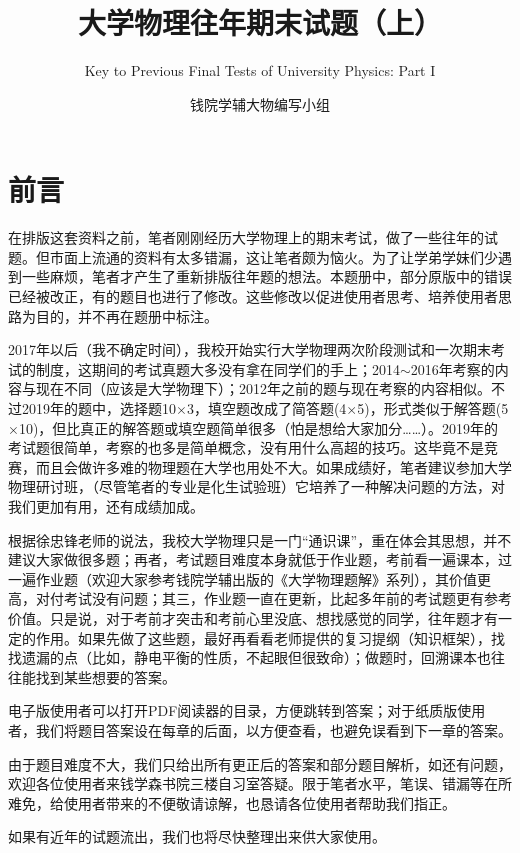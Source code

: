 \documentclass[b5paper,opensource]{./template/qyxf-book}
\title{大学物理往年期末试题（上）}
\subtitle{Key to Previous Final Tests of University Physics: Part I}
\author{钱院学辅大物编写小组}
\begin{document}
\maketitle
\pagestyle{plain}
\chapter*{前言}%
在排版这套资料之前，笔者刚刚经历大学物理上的期末考试，做了一些往年的试题。但市面上流通的资料有太多错漏，这让笔者颇为恼火。为了让学弟学妹们少遇到一些麻烦，笔者才产生了重新排版往年题的想法。本题册中，部分原版中的错误已经被改正，有的题目也进行了修改。这些修改以促进使用者思考、培养使用者思路为目的，并不再在题册中标注。

2017年以后（我不确定时间），我校开始实行大学物理两次阶段测试和一次期末考试的制度，这期间的考试真题大多没有拿在同学们的手上；2014$\sim$2016年考察的内容与现在不同（应该是大学物理下）；2012年之前的题与现在考察的内容相似。不过2019年的题中，选择题10$\times$3，填空题改成了简答题(4$\times$5)，形式类似于解答题(5$\times$10)，但比真正的解答题或填空题简单很多（怕是想给大家加分……）。2019年的考试题很简单，考察的也多是简单概念，没有用什么高超的技巧。这毕竟不是竞赛，而且会做许多难的物理题在大学也用处不大。如果成绩好，笔者建议参加大学物理研讨班，（尽管笔者的专业是化生试验班）它培养了一种解决问题的方法，对我们更加有用，还有成绩加成。

根据徐忠锋老师的说法，我校大学物理只是一门“通识课”，重在体会其思想，并不建议大家做很多题；再者，考试题目难度本身就低于作业题，考前看一遍课本，过一遍作业题（欢迎大家参考钱院学辅出版的《大学物理题解》系列），其价值更高，对付考试没有问题；其三，作业题一直在更新，比起多年前的考试题更有参考价值。只是说，对于考前才突击和考前心里没底、想找感觉的同学，往年题才有一定的作用。如果先做了这些题，最好再看看老师提供的复习提纲（知识框架），找找遗漏的点（比如，静电平衡的性质，不起眼但很致命）；做题时，回溯课本也往往能找到某些想要的答案。

电子版使用者可以打开PDF阅读器的目录，方便跳转到答案；对于纸质版使用者，我们将题目答案设在每章的后面，以方便查看，也避免误看到下一章的答案。

由于题目难度不大，我们只给出所有更正后的答案和部分题目解析，如还有问题，欢迎各位使用者来钱学森书院三楼自习室答疑。限于笔者水平，笔误、错漏等在所难免，给使用者带来的不便敬请谅解，也恳请各位使用者帮助我们指正。

如果有近年的试题流出，我们也将尽快整理出来供大家使用。
\vspace{2em}
\end{document}
